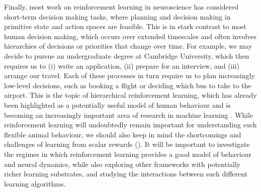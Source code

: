 Finally, most work on reinforcement learning in neuroscience has considered short-term decision making tasks, where planning and decision making in primitive state and action spaces are feasible.
This is in stark contrast to most human decision making, which occurs over extended timescales and often involves hierarchies of decisions or priorities that change over time.
For example, we may decide to pursue an undergraduate degree at Cambridge University, which then requires us to (i) write an application, (ii) prepare for an interview, and (iii) arrange our travel.
Each of these processes in turn require us to plan increasingly low-level decisions, such as booking a flight or deciding which bus to take to the airport.
This is the topic of hierarchical reinforcement learning, which has already been highlighted as a potentially useful model of human behaviour \citep{eckstein2020computational,botvinick2008hierarchical,botvinick2009hierarchically} and is becoming an increasingly important area of research in machine learning \citep{pateria2021hierarchical}.
While reinforcement learning will undoubtedly remain important for understanding such flexible animal behaviour, we should also keep in mind the shortcomings and challenges of learning from scalar rewards ().
It will be important to investigate the regimes in which reinforcement learning provides a good model of behaviour and neural dynamics, while also exploring other frameworks with potentially richer learning substrates, and studying the interactions between such different learning algorithms.


